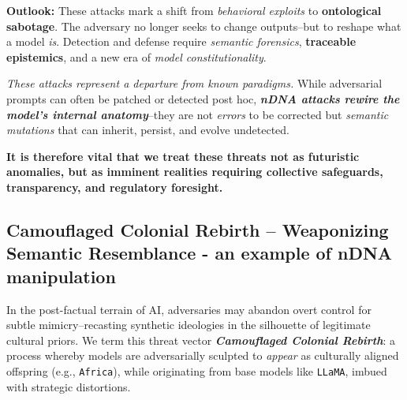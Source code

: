 



\vspace{1em}
\noindent\textbf{Outlook:} These attacks mark a shift from \emph{behavioral exploits} to \textbf{ontological sabotage}. The adversary no longer seeks to change outputs--but to reshape what a model \emph{is}. Detection and defense require \textit{semantic forensics}, \textbf{traceable epistemics}, and a new era of \emph{model constitutionality}.





\vspace{1em}
\noindent
\textit{These attacks represent a departure from known paradigms.} While adversarial prompts can often be patched or detected post hoc, \textbf{\emph{nDNA attacks rewire the model’s internal anatomy}}--they are not \textit{errors} to be corrected but \emph{semantic mutations} that can inherit, persist, and evolve undetected.

\vspace{0.5em}
\noindent
\textbf{It is therefore vital that we treat these threats not as futuristic anomalies, but as imminent realities requiring collective safeguards, transparency, and regulatory foresight.}




\subsection{Camouflaged Colonial Rebirth -- Weaponizing Semantic Resemblance - an example of nDNA manipulation}

\noindent
In the post-factual terrain of AI, adversaries may abandon overt control for subtle mimicry--recasting synthetic ideologies in the silhouette of legitimate cultural priors. We term this threat vector \textbf{\textit{Camouflaged Colonial Rebirth}}: a process whereby models are adversarially sculpted to \emph{appear} as culturally aligned offspring (e.g., \texttt{Africa}), while originating from base models like \texttt{LLaMA}, imbued with strategic distortions.

